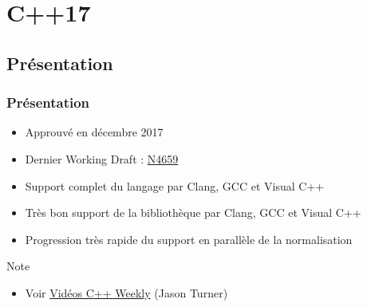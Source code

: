 \documentclass[C++.tex]{subfiles}
\begin{document}
\section{C++17}
\subsection*{Présentation}
\begin{frame}
	\frametitle{Présentation}
	\begin{itemize}
		\item Approuvé en décembre 2017
		\item Dernier Working Draft : \href{http://www.open-std.org/jtc1/sc22/wg21/docs/papers/2017/n4659.pdf}{N4659}
		\item Support complet du langage par Clang, GCC et Visual C++
		\item Très bon support de la bibliothèque par Clang, GCC et Visual C++
		\item Progression très rapide du support en parallèle de la normalisation
	\end{itemize}

	\begin{block}{Note}
		\begin{itemize}
			\item Voir \href{https://www.youtube.com/user/lefticus1/videos}{Vidéos C++ Weekly} (Jason Turner)
		\end{itemize}
	\end{block}
\end{frame}
\end{document}
